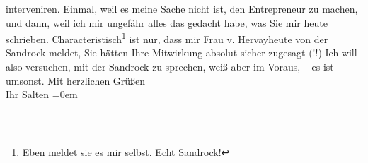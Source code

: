 \begin{ledgroupsized}[t]{13cm}
               interveniren. Einmal, weil es meine Sache nicht ist, den Entrepreneur zu machen, und
               dann, weil ich mir ungefähr alles das gedacht habe, was Sie mir heute schrieben.\pend
           \pstart
           Characteristisch\footnote{\noindent{}Eben meldet sie es mir selbst. Echt Sandrock!} ist nur, dass mir Frau v. Hervayheute von der Sandrock meldet, Sie hätten Ihre Mitwirkung absolut sicher zugesagt (!!) Ich
               will also versuchen, mit der Sandrock zu
               sprechen, weiß aber im Voraus, – es ist umsonst.\pend
           \pstart
           Mit herzlichen Grüßen{\\[\baselineskip]}Ihr \spacefill\mbox{Salten}\pend
           \leftskip=0em{}
         
         \endnumbering{}\end{ledgroupsized}  \newcommand{\dateiname}{L03405}\newcommand{\titel}{Felix Salten an Arthur Schnitzler, 11. 1. 1905}\newcommand{\editorInnen}{Martin Anton Müller und Laura Untner}
      